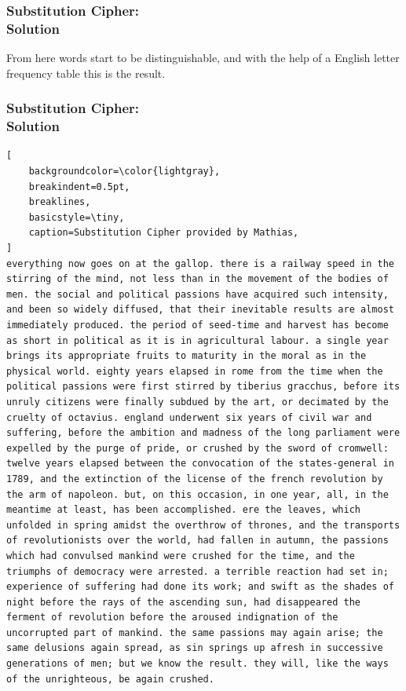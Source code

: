 \documentclass{uva-inf-presentation}
\begin{document}
\begin{frame}
\frametitle{Substitution Cipher:\\ Solution}
From here words start to be distinguishable, and with the help of a English
letter frequency table this is the result.
\end{frame}

\begin{frame}[containsverbatim]
\frametitle{Substitution Cipher:\\ Solution}
\vspace{-20pt}
\begin{lstlisting}[
    backgroundcolor=\color{lightgray},
    breakindent=0.5pt,
    breaklines,
    basicstyle=\tiny,
    caption=Substitution Cipher provided by Mathias,
]
everything now goes on at the gallop. there is a railway speed in the stirring of the mind, not less than in the movement of the bodies of men. the social and political passions have acquired such intensity, and been so widely diffused, that their inevitable results are almost immediately produced. the period of seed-time and harvest has become as short in political as it is in agricultural labour. a single year brings its appropriate fruits to maturity in the moral as in the physical world. eighty years elapsed in rome from the time when the political passions were first stirred by tiberius gracchus, before its unruly citizens were finally subdued by the art, or decimated by the cruelty of octavius. england underwent six years of civil war and suffering, before the ambition and madness of the long parliament were expelled by the purge of pride, or crushed by the sword of cromwell: twelve years elapsed between the convocation of the states-general in 1789, and the extinction of the license of the french revolution by the arm of napoleon. but, on this occasion, in one year, all, in the meantime at least, has been accomplished. ere the leaves, which unfolded in spring amidst the overthrow of thrones, and the transports of revolutionists over the world, had fallen in autumn, the passions which had convulsed mankind were crushed for the time, and the triumphs of democracy were arrested. a terrible reaction had set in; experience of suffering had done its work; and swift as the shades of night before the rays of the ascending sun, had disappeared the ferment of revolution before the aroused indignation of the uncorrupted part of mankind. the same passions may again arise; the same delusions again spread, as sin springs up afresh in successive generations of men; but we know the result. they will, like the ways of the unrighteous, be again crushed.
\end{lstlisting}
\end{frame}
\end{document}
